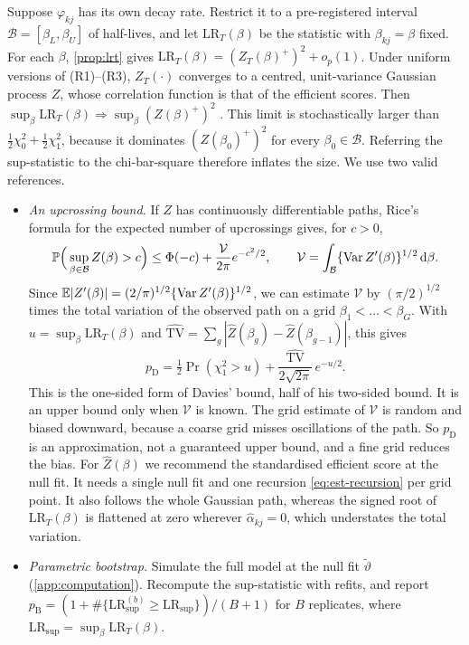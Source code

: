 Suppose $\varphi_{kj}$ has its
own decay rate. Restrict it to a pre-registered interval $\mathcal B=[\beta_L,\beta_U]$ of
half-lives, and let $\mathrm{LR}_T(\beta)$ be the statistic with $\beta_{kj}=\beta$ fixed. For
each $\beta$, \cref{prop:lrt} gives $\mathrm{LR}_T(\beta)=(Z_T(\beta)^+)^2+o_p(1)$. Under
uniform versions of (R1)--(R3), $Z_T(\cdot)$ converges to a centred, unit-variance Gaussian
process $Z$, whose correlation function is that of the efficient scores. Then
$\sup_\beta\mathrm{LR}_T(\beta)\Rightarrow\sup_\beta(Z(\beta)^+)^2$
\citep{davies1977,davies1987}. This limit is stochastically larger than
$\tfrac12\chi^2_0+\tfrac12\chi^2_1$, because it dominates $(Z(\beta_0)^+)^2$ for every
$\beta_0\in\mathcal B$. Referring the sup-statistic to the chi-bar-square therefore inflates
the size. We use two valid references.
\begin{itemize}
  \item \emph{An upcrossing bound.} If $Z$ has continuously differentiable paths, Rice's
    formula for the expected number of upcrossings gives, for $c>0$,
    \[
      \mathbb{P}\Big(\sup_{\beta\in\mathcal B}Z(\beta)>c\Big)\le\Phi(-c)+\frac{\mathcal V}{2\pi}e^{-c^2/2},\qquad
      \mathcal V=\int_{\mathcal B}\{\operatorname{Var} Z'(\beta)\}^{1/2}\,\mathrm{d}\beta .
    \]
    Since $\mathbb{E}|Z'(\beta)|=(2/\pi)^{1/2}\{\operatorname{Var} Z'(\beta)\}^{1/2}$, we can estimate
    $\mathcal V$ by $(\pi/2)^{1/2}$ times the total variation of the observed path on a
    grid $\beta_1<\dots<\beta_G$. With $u=\sup_\beta\mathrm{LR}_T(\beta)$ and
    $\widehat{\mathrm{TV}}=\sum_g|\hat Z(\beta_g)-\hat Z(\beta_{g-1})|$, this gives
    \[
      p_{\mathrm D}=\tfrac12\Pr(\chi^2_1>u)+\frac{\widehat{\mathrm{TV}}}{2\sqrt{2\pi}}\,e^{-u/2}.
    \]
    This is the one-sided form of Davies' bound, half of his two-sided bound. It is an
    upper bound only when $\mathcal V$ is known. The grid estimate of $\mathcal V$ is
    random and biased downward, because a coarse grid misses oscillations of the path. So
    $p_{\mathrm D}$ is an approximation, not a guaranteed upper bound, and a fine grid
    reduces the bias. For $\hat Z(\beta)$ we recommend the standardised efficient score at
    the null fit. It needs a single null fit and one recursion \eqref{eq:est-recursion} per
    grid point. It also follows the whole Gaussian path, whereas the signed root of
    $\mathrm{LR}_T(\beta)$ is flattened at zero wherever $\hat\alpha_{kj}=0$, which
    understates the total variation.
  \item \emph{Parametric bootstrap.} Simulate the full model at the null fit
    $\tilde\vartheta$ (\cref{app:computation}). Recompute the sup-statistic with refits,
    and report $p_{\mathrm B}=(1+\#\{\mathrm{LR}^{(b)}_{\sup}\ge\mathrm{LR}_{\sup}\})/(B+1)$ for
    $B$ replicates, where $\mathrm{LR}_{\sup}=\sup_\beta\mathrm{LR}_T(\beta)$.
\end{itemize}

